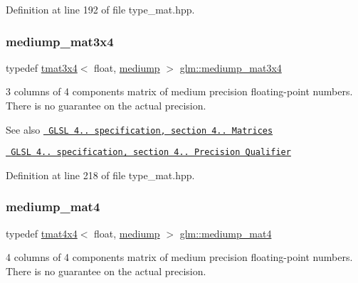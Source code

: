 Definition at line 192 of file type\+\_\+mat.\+hpp.

\mbox{\label{group__core__precision_ga0ea90a4a20efa6c104c7ad21144ccefe}} 
\subsubsection{\texorpdfstring{mediump\_mat3x4}{mediump\_mat3x4}}
{\footnotesize\ttfamily typedef \mbox{\hyperlink{structglm_1_1tmat3x4}{tmat3x4}}$<$ float, \mbox{\hyperlink{namespaceglm_a0f04f086094c747d227af4425893f545a6416f3ea0c9025fb21ed50c4d6620482}{mediump}} $>$ \mbox{\hyperlink{group__core__precision_ga0ea90a4a20efa6c104c7ad21144ccefe}{glm\+::mediump\+\_\+mat3x4}}}

3 columns of 4 components matrix of medium precision floating-\/point numbers. There is no guarantee on the actual precision.

\begin{DoxySeeAlso}{See also}
\href{http://www.opengl.org/registry/doc/GLSLangSpec.4.20.8.pdf}{\texttt{ G\+L\+SL 4.. specification, section 4.. Matrices}} 

\href{http://www.opengl.org/registry/doc/GLSLangSpec.4.20.8.pdf}{\texttt{ G\+L\+SL 4.. specification, section 4.. Precision Qualifier}} 
\end{DoxySeeAlso}


Definition at line 218 of file type\+\_\+mat.\+hpp.

\mbox{\label{group__core__precision_ga2bd55bee1eaded7673421b1ae24175d5}} 
\subsubsection{\texorpdfstring{mediump\_mat4}{mediump\_mat4}}
{\footnotesize\ttfamily typedef \mbox{\hyperlink{structglm_1_1tmat4x4}{tmat4x4}}$<$ float, \mbox{\hyperlink{namespaceglm_a0f04f086094c747d227af4425893f545a6416f3ea0c9025fb21ed50c4d6620482}{mediump}} $>$ \mbox{\hyperlink{group__core__precision_ga2bd55bee1eaded7673421b1ae24175d5}{glm\+::mediump\+\_\+mat4}}}

4 columns of 4 components matrix of medium precision floating-\/point numbers. There is no guarantee on the actual precision.

